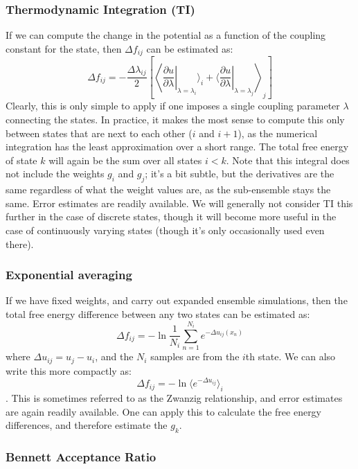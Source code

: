 \documentclass[superscriptaddress,showkeys, nofootinbib, pre, aps]{revtex4-1}
\newcommand{\dudl}[1]{\left.\frac{\partial u}{\partial \lambda}\right|_{\lambda=\lambda_{#1}}}
\begin{document}
\subsubsection{Thermodynamic Integration (TI)}
If we can compute the change in the potential as a function of the coupling constant for the state, then $\Delta f_{ij}$ can be estimated as:
\[
\Delta f_{ij} = -\frac{\Delta \lambda_{ij}}{2}\left[\left\langle \dudl{i} \rangle_i + \langle \dudl{j} \right\rangle_j \right]
\]
Clearly, this is only simple to apply if one imposes a single coupling parameter $\lambda$ connecting the states. In practice, it makes the
most sense to compute this only between states that are next to each
other ($i$ and $i+1$), as the numerical integration has the least
approximation over a short range. The total free energy of state $k$
will again be the sum over all states $i<k$.  Note that this integral
does not include the weights $g_i$ and $g_j$; it's a bit subtle, but
the derivatives are the same regardless of what the weight values are,
as the sub-ensemble stays the same. Error estimates are readily available. We will generally not consider TI this further in the case of discrete states, though it will become more useful in the case of continuously varying states (though it's only occasionally used even there).

\subsubsection{Exponential averaging}
If we have fixed weights, and carry out expanded ensemble simulations, then the total free energy difference between any two states can be estimated as:
\[
\Delta f_{ij} = -\ln \frac{1}{N_i}\sum_{n=1}^{N_i} e^{-\Delta u_{ij}(x_n)}
\]
where $\Delta u_{ij} = u_j - u_i$, and the $N_i$ samples are from the $i$th state.  We can also write this more compactly as:
\[
\Delta f_{ij} = -\ln \langle e^{-\Delta u_{ij}}\rangle_i
\]. 
This is sometimes referred to as the Zwanzig relationship, and error estimates are again readily available. One can apply this to calculate the free energy differences, and therefore estimate the $g_k$.

\subsubsection{Bennett Acceptance Ratio}
\end{document}
